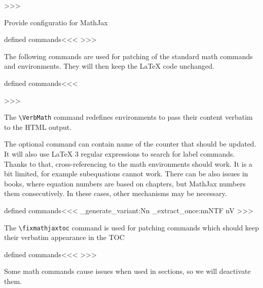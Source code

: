 >>>

Provide configuratio for MathJax

\<defined commands\><<<
>>>

The following commands are used for patching of the standard math commands and
environments. They will then keep the LaTeX code unchanged.

\<defined commands\><<<

\long\def\AltlMath#1\){\expandafter\alteqtoks{\(#1\)}\)}
\long{}
\long{}
\long{}

\newcommand\VerbMathToks[2]{%
  \alteqtoks{\begin{#2}
    #1
  \end{#2}}%
}
>>>

The \verb|\VerbMath| command redefines environments to pass their content
verbatim to the HTML output.

The optional command can contain name of the counter that should be updated.
It will also use LaTeX 3 regular expressions to search for label commands.
Thanks to that, cross-referencing to the math environments should work.
It is a bit limited, for example subequations cannot work. There can be also
issues in books, where equation numbers are based on chapters, but MathJax
numbers them consecutively. In these cases, other mechanisms may be necessary.

\<defined commands\><<<
\ExplSyntaxOn
\cs_generate_variant:Nn \regex_extract_once:nnNTF {nV}
\newcommand\VerbMath[2][]{%
  \cs_if_exist:cTF{#1}{
    \RenewDocumentEnvironment{#2}{+!b}{%
      \NoFonts\expandafter\VerbMathToks\expandafter{\detokenize{##1}}{#2}\EndNoFonts%
      \ifx\relax#1\relax\else%
      \refstepcounter{#1}%
      \regex_extract_once:nVNTF { label\s* \x{7B}([^\x{7D}]*)\x{7D}} {\l_tmpb_tl} \l_tmp_seq {\label{\seq_item:Nn\l_tmp_seq{2}}} {}%
      \fi
    }{}
  }{}%
}
\ExplSyntaxOff
>>>

The \verb|\fixmathjaxtoc| command is used for patching commands which should
keep their verbatim appearance in the TOC

\<defined commands\><<<
\def\fixmathjaxtoc#1{\Configure{writetoc}{\def#1{\detokenize{#1}}}}
>>>

Some math commands cause issues when used in sections, so we will deactivate them.


